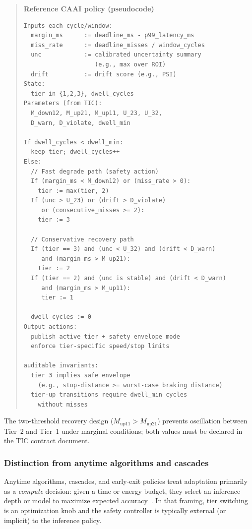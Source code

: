 \documentclass[smallextended]{svjour3}
\newenvironment{designbox}[1]{%
  \begin{quote}\small\noindent\textbf{#1}\par\smallskip%
}{\end{quote}}
\begin{document}
\begin{designbox}{Reference CAAI policy (pseudocode)}
\begin{Verbatim}[fontsize=\scriptsize]
Inputs each cycle/window:
  margin_ms      := deadline_ms - p99_latency_ms
  miss_rate      := deadline_misses / window_cycles
  unc            := calibrated uncertainty summary
                    (e.g., max over ROI)
  drift          := drift score (e.g., PSI)
State:
  tier in {1,2,3}, dwell_cycles
Parameters (from TIC):
  M_down12, M_up21, M_up11, U_23, U_32,
  D_warn, D_violate, dwell_min

If dwell_cycles < dwell_min:
  keep tier; dwell_cycles++
Else:
  // Fast degrade path (safety action)
  If (margin_ms < M_down12) or (miss_rate > 0):
    tier := max(tier, 2)
  If (unc > U_23) or (drift > D_violate)
     or (consecutive_misses >= 2):
    tier := 3

  // Conservative recovery path
  If (tier == 3) and (unc < U_32) and (drift < D_warn)
     and (margin_ms > M_up21):
    tier := 2
  If (tier == 2) and (unc is stable) and (drift < D_warn)
     and (margin_ms > M_up11):
     tier := 1

  dwell_cycles := 0
Output actions:
  publish active tier + safety envelope mode
  enforce tier-specific speed/stop limits

auditable invariants:
  tier 3 implies safe envelope
    (e.g., stop-distance >= worst-case braking distance)
  tier-up transitions require dwell_min cycles
    without misses
\end{Verbatim}
\end{designbox}

The two-threshold recovery design (\(M_{\text{up11}} > M_{\text{up21}}\)) prevents oscillation
between Tier~2 and Tier~1 under marginal conditions; both
values must be declared in the TIC contract document.

\subsubsection{Distinction from anytime algorithms and cascades}
\label{subsec:caai_novelty}
Anytime algorithms, cascades, and early-exit policies treat adaptation primarily as a \emph{compute} decision: given a time or energy budget, they select an inference depth or model to maximize expected accuracy~\cite{zilberstein1996anytime,deanboddy1988,shihliu1995}. In that framing, tier switching is an optimization knob and the safety controller is typically external (or implicit) to the inference policy.
\end{document}
